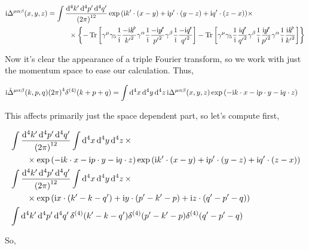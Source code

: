 \begin{align}
    \textnormal{i}\Delta^{\mu\alpha\beta}\qty(x,y,z)&=\int\frac{\dd[4]{{k'}}\dd[4]{{p'}}\dd[4]{{q'}}}{\qty(2\pi)^{12}}
        \exp\qty(\textnormal{i} {k'}\cdot\qty(x-y)+\textnormal{i} {p'}\cdot\qty(y-z)+\textnormal{i} {q'}\cdot\qty(z-x))\times\nonumber\\
        &\quad\quad\quad\times\qty{-\Tr\qty[\gamma^\mu\gamma_5\frac1{\textnormal{i}}\frac{-\textnormal{i}\slashed {k'}}{{k'}^2}\gamma^\alpha\frac1{\textnormal{i}}\frac{-\textnormal{i}\slashed {p'}}{{p'}^2}\gamma^\beta\frac1{\textnormal{i}}\frac{-\textnormal{i}\slashed {q'}}{{q'}^2}]-\Tr\qty[\gamma^\mu\gamma_5\frac1{\textnormal{i}}\frac{\textnormal{i}\slashed {q'}}{{q'}^2}\gamma^\beta\frac1{\textnormal{i}}\frac{\textnormal{i}\slashed {p'}}{{p'}^2}\gamma^\alpha\frac1{\textnormal{i}}\frac{\textnormal{i}\slashed {k'}}{{k'}^2}]}\nonumber
\end{align}

Now it's clear the appearance of a triple Fourier transform, so we work with just the momentum space to ease 
our calculation. Thus,

\begin{align}
    \textnormal{i}{\tilde\Delta}^{\mu\alpha\beta}\qty(k,p,q)\qty(2\pi)^4\delta^{\qty(4)}\qty(k+p+q)&=
        \int\dd[4]{x}\dd[4]{y}\dd[4]{z}\textnormal{i}\Delta^{\mu\alpha\beta}\qty(x,y,z)\exp\qty(-\textnormal{i} k\cdot x-\textnormal{i} p\cdot y-\textnormal{i} q\cdot z)\nonumber
\end{align}

This affects primarily just the space dependent part, so let's compute first,

\begin{align}
    &\int\frac{\dd[4]{k'}\dd[4]{p'}\dd[4]{q'}}{\qty(2\pi)^{12}}\int\dd[4]{x}\dd[4]{y}\dd[4]{z}\times\nonumber\\
    &\quad\quad\times\exp\qty(-\textnormal{i} k\cdot x-\textnormal{i} p\cdot y-\textnormal{i} q\cdot z)
        \exp\qty(\textnormal{i} k'\cdot\qty(x-y)+\textnormal{i} p'\cdot\qty(y-z)+\textnormal{i} q'\cdot\qty(z-x))\nonumber\\
        &\int\frac{\dd[4]{k'}\dd[4]{p'}\dd[4]{q'}}{\qty(2\pi)^{12}}\int\dd[4]{x}\dd[4]{y}\dd[4]{z}\times\nonumber\\
    &\quad\quad\times\exp\qty(\textnormal{i} x\cdot\qty(k'-k-q')+\textnormal{i} y\cdot \qty(p'-k'-p)+\textnormal{i} z\cdot\qty(q'-p'-q))\nonumber\\
    &\int\dd[4]{k'}\dd[4]{p'}\dd[4]{q'}\delta^{\qty(4)}\qty(k'-k-q')\delta^{\qty(4)}\qty(p'-k'-p)\delta^{\qty(4)}\qty(q'-p'-q)\nonumber
\end{align}

So,

